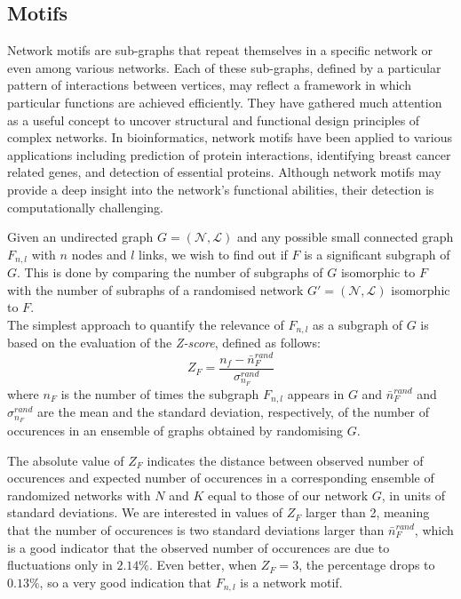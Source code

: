\subsection{Motifs}
Network motifs are sub-graphs that repeat themselves in a specific network or even among various networks. Each of these sub-graphs, defined by a particular pattern of interactions between vertices, may reflect a framework in which particular functions are achieved efficiently. They have gathered much attention as a useful concept to uncover structural and functional design principles of complex networks. In bioinformatics, network motifs have been applied to various applications including prediction of protein interactions, identifying breast cancer related genes, and detection of essential proteins. Although network motifs may provide a deep insight into the network's functional abilities, their detection is computationally challenging.\par 

Given an undirected graph $G=(\mathcal{N},\mathcal{L})$ and any possible small connected graph $F_{n,l}$ with $n$ nodes and $l$ links, we wish to find out if $F$ is a significant subgraph of $G$. This is done by comparing the number of subgraphs of $G$ isomorphic to $F$ with the number of subraphs of a randomised network $G'=(\mathcal{N},\mathcal{L})$ isomorphic to $F$.\\
The simplest approach to quantify the relevance of $F_{n,l}$ as a subgraph of $G$ is based on the evaluation of the {\it Z-score}, defined as follows:
\begin{equation}
Z_F = \frac{n_f - \bar{n}^{rand}_F}{\sigma_{n_F}^{rand}}
\end{equation}
where $n_F$ is the number of times the subgraph $F_{n,l}$ appears in $G$ and $\bar{n}^{rand}_F$ and $\sigma_{n_F}^{rand}$ are the mean and the standard deviation, respectively, of the number of occurences in an ensemble of graphs obtained by randomising $G$.\par 
The absolute value of $Z_F$ indicates the distance between observed number of occurences and expected number of occurences in a corresponding ensemble of randomized networks with $N$ and $K$ equal to those of our network $G$, in units of standard deviations. We are interested in values of $Z_F$ larger than 2, meaning that the number of occurences is two standard deviations larger than $\bar{n}^{rand}_F$, which is a good indicator that the observed number of occurences are due to fluctuations only in $2.14\%$. Even better, when $Z_F=3$, the percentage drops to $0.13\%$, so a very good indication that $F_{n,l}$ is a network motif.


